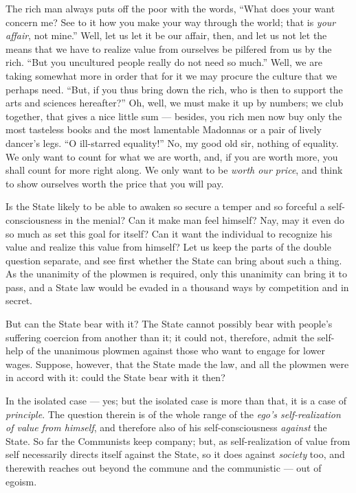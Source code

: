 The rich man always puts off the poor with the words, ``What does your want 
concern me? See to it how you make your way through the world; that is 
\textit{your affair}, not mine.'' Well, let us let it be our affair, then, 
and let us not let the means that we have to realize value from ourselves be 
pilfered from us by the rich. ``But you uncultured people really do not need 
so much.'' Well, we are taking somewhat more in order that for it we may 
procure the culture that we perhaps need. ``But, if you thus bring down the 
rich, who is then to support the arts and sciences hereafter?'' Oh, well, we 
must make it up by numbers; we club together, that gives a nice little sum --- besides, you rich men now buy only the most tasteless books and the most 
lamentable Madonnas or a pair of lively dancer's legs. ``O ill-starred 
equality!'' No, my good old sir, nothing of equality. We only want to count 
for what we are worth, and, if you are worth more, you shall count for more 
right along. We only want to be \textit{worth our price}, and think to show 
ourselves worth the price that you will pay.

Is the State likely to be able to awaken so secure a temper and so forceful a 
self-consciousness in the menial? Can it make man feel himself? Nay, may it 
even do so much as set this goal for itself? Can it want the individual to 
recognize his value and realize this value from himself? Let us keep the parts 
of the double question separate, and see first whether the State can bring 
about such a thing. As the unanimity of the plowmen is required, only this 
unanimity can bring it to pass, and a State law would be evaded in a thousand 
ways by competition and in secret.

But can the State bear with it? The State cannot possibly bear with people's 
suffering coercion from another than it; it could not, therefore, admit the 
self-help of the unanimous plowmen against those who want to engage for lower 
wages. Suppose, however, that the State made the law, and all the plowmen were 
in accord with it: could the State bear with it then?

In the isolated case --- yes; but the isolated case is more than that, it is a 
case of \textit{principle}. The question therein is of the whole range of the 
\textit{ego's self-realization of value from himself}, and therefore also of 
his self-consciousness \textit{against} the State. So far the Communists keep 
company; but, as self-realization of value from self necessarily directs 
itself against the State, so it does against \textit{society} too, and 
therewith reaches out beyond the commune and the communistic --- out of egoism.

